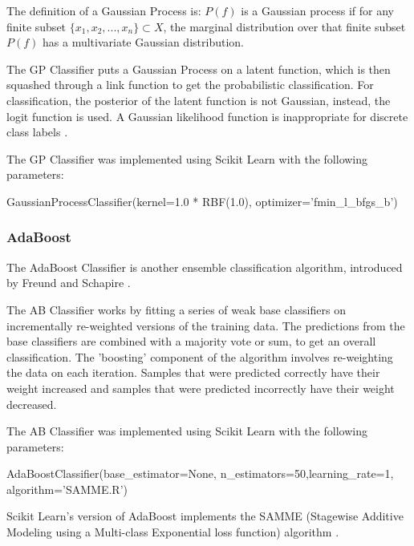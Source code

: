 The definition of a Gaussian Process is: $P(f)$ is a Gaussian process if for any finite subset $\{x_1,x_2,...,x_n\} \subset X$, the marginal distribution over that finite subset $P(f)$ has a multivariate Gaussian distribution.

The GP Classifier puts a Gaussian Process on a latent function, which is then squashed through a link function to get the probabilistic classification. For classification, the posterior of the latent function is not Gaussian, instead, the logit function is used. A Gaussian likelihood function is inappropriate for discrete class labels \cite{gaussianProcesses2006}.

The GP Classifier was implemented using Scikit Learn with the following parameters:

\begin{tcolorbox}
\begin{center}
	GaussianProcessClassifier(kernel=1.0 * RBF(1.0), optimizer='fmin\_l\_bfgs\_b')
\end{center}
\end{tcolorbox}

\subsubsection*{AdaBoost}

The AdaBoost Classifier is another ensemble classification algorithm, introduced by Freund and Schapire \cite{adaboost1997}.

The AB Classifier works by fitting a series of weak base classifiers on incrementally re-weighted versions of the training data. The predictions from the base classifiers are combined with a majority vote or sum, to get an overall classification. The 'boosting' component of the algorithm involves re-weighting the data on each iteration. Samples that were predicted correctly have their weight increased and samples that were predicted incorrectly have their weight decreased.

The AB Classifier was implemented using Scikit Learn with the following parameters:

\begin{tcolorbox}
\begin{center}
	AdaBoostClassifier(base\_estimator=None, n\_estimators=50,learning\_rate=1, algorithm=’SAMME.R’)
\end{center}
\end{tcolorbox}

Scikit Learn's version of AdaBoost implements the SAMME (Stagewise Additive Modeling using a Multi-class Exponential loss function) algorithm \cite{multiclassada2009}.

